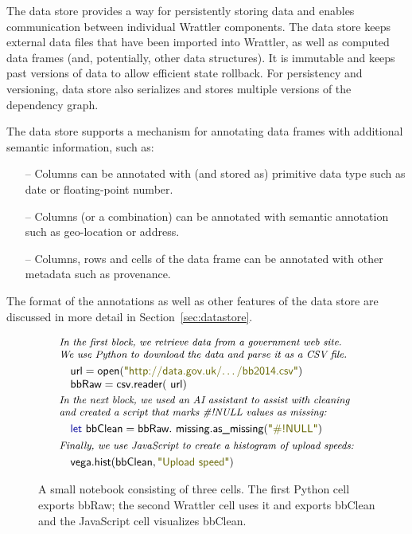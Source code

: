 \documentclass[sigplan,preprint,10pt]{acmart}\settopmatter{printfolios=true,printccs=false,printacmref=false}
\newcommand{\str}[1]{\textnormal{\textcolor{strclr}{\sffamily "#1"}}}
\newcommand{\ident}[1]{\textnormal{\sffamily #1}}
\newcommand{\kvd}[1]{\textnormal{\textcolor{kvdclr}{\sffamily #1}}}
\begin{document}
The data store provides a way for persistently storing data and enables communication between
individual Wrattler components. The data store keeps external data files that have been
imported into Wrattler,
as well as computed data frames (and, potentially, other data structures). It is immutable
and keeps past versions of data to allow efficient state rollback. For persistency and versioning,
data store also serializes and stores multiple versions of the dependency graph.

The data store supports a mechanism for annotating data frames with additional semantic information, such as:
%
\begin{itemize}
\item[--] Columns can be annotated with (and stored as) primitive data type such as date or floating-point number.
\item[--] Columns (or a combination) can be annotated with semantic annotation such as geo-location or address.
\item[--] Columns, rows and cells of the data frame can be annotated with other metadata such as provenance.
\end{itemize}

\noindent
The format of the annotations as well as other features of the data store are discussed in
more detail in Section~\ref{sec:datastore}.

\begin{figure}
\begin{equation*}
\begin{array}{l}
\textit{\small{In the first block, we retrieve data from a government web site.}}\\[-0.1em]
\textit{\small{We use Python to download the data and parse it as a CSV file.}}\\[0.3em]
\quad\ident{url}=\ident{open}(\str{http://data.gov.uk/\ldots/bb2014.csv})\\
\quad\ident{bbRaw}=\ident{csv.reader}(\ident{url})\\[0.2em]
\textit{\small{In the next block, we used an AI assistant to assist with cleaning}}\\[-0.1em]
\textit{\small{and created a script that marks \#!NULL values as missing:}}\\[0.3em]
\quad\kvd{let}~\ident{bbClean} = \ident{bbRaw}.\ident{missing}.\ident{as\_missing}(\str{\#!NULL})\\[0.3em]
\textit{\small{Finally, we use JavaScript to create a histogram of upload speeds:}}\\[0.3em]
\quad\ident{vega}.\ident{hist}(\ident{bbClean}, \str{Upload speed})
\end{array}
\end{equation*}
\vspace{-0.5em}
\caption{\small{A small notebook consisting of three cells. The first Python cell exports
\ident{bbRaw}; the second Wrattler cell uses it and exports \ident{bbClean} and the
JavaScript cell visualizes \ident{bbClean}.}}
\label{fig:notebook}
\end{figure}
\end{document}
